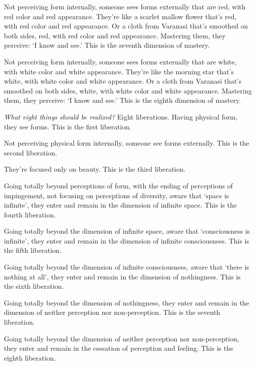 \documentclass[12pt,openany]{book}%
\begin{document}
Not perceiving form internally, someone sees forms externally that are red, with red color and red appearance. They’re like a scarlet mallow flower that’s red, with red color and red appearance. Or a cloth from Varanasi that’s smoothed on both sides, red, with red color and red appearance. Mastering them, they perceive: ‘I know and see.’ This is the seventh dimension of mastery. 

Not perceiving form internally, someone sees forms externally that are white, with white color and white appearance. They’re like the morning star that’s white, with white color and white appearance. Or a cloth from Varanasi that’s smoothed on both sides, white, with white color and white appearance. Mastering them, they perceive: ‘I know and see.’ This is the eighth dimension of mastery. 

\emph{What eight things should be realized?} Eight liberations. Having physical form, they see forms. This is the first liberation. 

Not perceiving physical form internally, someone see forms externally. This is the second liberation. 

They’re focused only on beauty. This is the third liberation. 

Going totally beyond perceptions of form, with the ending of perceptions of impingement, not focusing on perceptions of diversity, aware that ‘space is infinite’, they enter and remain in the dimension of infinite space. This is the fourth liberation. 

Going totally beyond the dimension of infinite space, aware that ‘consciousness is infinite’, they enter and remain in the dimension of infinite consciousness. This is the fifth liberation. 

Going totally beyond the dimension of infinite consciousness, aware that ‘there is nothing at all’, they enter and remain in the dimension of nothingness. This is the sixth liberation. 

Going totally beyond the dimension of nothingness, they enter and remain in the dimension of neither perception nor non-perception. This is the seventh liberation. 

Going totally beyond the dimension of neither perception nor non-perception, they enter and remain in the cessation of perception and feeling. This is the eighth liberation. 
\end{document}
